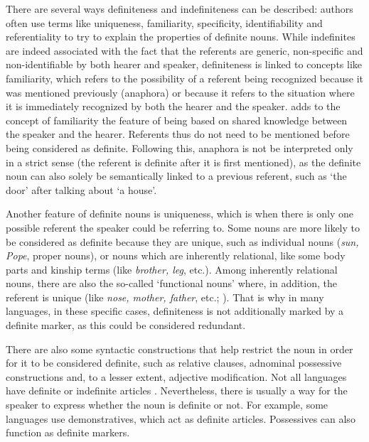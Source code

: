 \documentclass[output=paper]{langsci/langscibook}
\begin{document}
There are several ways definiteness and indefiniteness can be described: authors often use terms like uniqueness, familiarity, specificity, identifiability and referentiality to try to explain the properties of definite nouns. While indefinites are indeed associated with the fact that the referents are generic, non-specific and non-identifiable by both hearer and speaker,  definiteness is linked to concepts like familiarity, which refers to the possibility of a referent being recognized because it was mentioned previously (anaphora) or because it refers to the situation where it is immediately recognized by both the hearer and the speaker. \cite[][28]{christophersen:39} adds to the concept of familiarity the feature of being based on shared knowledge between the speaker and the hearer. Referents thus do not need to be mentioned before being considered as definite. Following this, anaphora is not be interpreted only in a strict sense (the referent is definite after it is first mentioned), as the definite noun can also solely be semantically linked to a previous referent, such as `the door' after talking about `a house'.

Another feature of definite nouns is uniqueness, which is when there is only one possible referent the speaker could be referring to. Some nouns are more likely to be considered as definite because they are unique, such as individual nouns  ({\emph{sun, Pope}}, proper nouns), or nouns which are inherently relational, like some body parts and kinship terms (like {\emph{brother, leg}}, etc.). Among inherently relational nouns, there are also the so-called `functional nouns' where, in addition, the referent is unique (like {\emph{nose, mother, father}}, etc.; \citealt[][307]{lobner:11}). That is why in many languages, in these specific cases, definiteness is not additionally marked by a definite marker, as this could be considered redundant.

There are also some syntactic constructions that help restrict the noun in order for it to be considered definite, such as relative clauses, adnominal possessive constructions and, to a lesser extent, adjective modification. Not all languages have definite or indefinite articles \citep{dryer:13a:5,dryer:13b:5}. Nevertheless, there is usually a way for the speaker to express whether the noun is definite or not. For example, some languages use demonstratives, which act as definite articles. Possessives can also function as definite markers.
\end{document}
